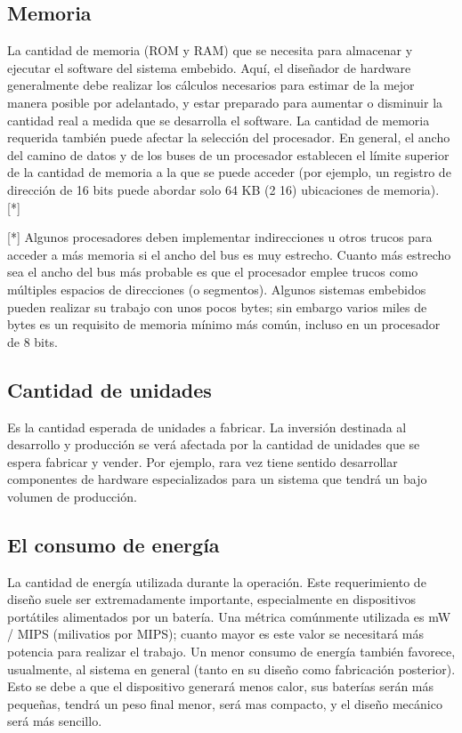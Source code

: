 \documentclass[output=paper, 
colorlinks,
citecolor=brown,
newtxmath
]{langscibook}
\begin{document}
\subsection {Memoria}

La cantidad de memoria (ROM y RAM) que se necesita para almacenar
y ejecutar el software del sistema embebido. Aquí, el diseñador de 
hardware generalmente debe realizar los cálculos necesarios para
estimar de la mejor manera posible por adelantado, y estar preparado para 
aumentar o disminuir la cantidad real a medida que se desarrolla el software. 
La cantidad de memoria requerida también puede afectar la selección del 
procesador. En general, el ancho del camino de datos y de los buses de un procesador 
establecen el límite superior de la cantidad de memoria a la que se puede 
acceder (por ejemplo, un registro de dirección de 16 bits puede abordar solo 
64 KB (2 16) ubicaciones de memoria). [*]


[*]
Algunos procesadores deben implementar indirecciones u otros trucos
para acceder a más memoria si el ancho del bus es muy estrecho.
Cuanto más estrecho sea el ancho del bus más probable es que el procesador 
emplee trucos como múltiples espacios de direcciones (o segmentos).
Algunos sistemas embebidos pueden realizar su trabajo
con unos pocos bytes; sin embargo varios miles de bytes es un requisito de
memoria mínimo más común, incluso en un procesador de 8 bits.


\subsection {Cantidad de unidades}

Es la cantidad esperada de unidades a fabricar. 
La inversión destinada al desarrollo y producción se verá afectada 
por la cantidad de unidades que se espera fabricar y vender.
Por ejemplo, rara vez tiene sentido desarrollar componentes de 
hardware especializados para un sistema que tendrá un bajo volumen de producción.



\subsection {El consumo de energía}

La cantidad de energía utilizada durante la operación. 
Este requerimiento de diseño suele ser extremadamente importante, 
especialmente en dispositivos portátiles alimentados por un batería. 
Una métrica comúnmente utilizada es mW / MIPS (milivatios por MIPS); 
cuanto mayor es este valor se necesitará más potencia para realizar el trabajo. 
Un menor consumo de energía también favorece, usualmente,
al sistema en general (tanto en su diseño como fabricación posterior). Esto
se debe a que el dispositivo generará menos calor, sus
baterías serán más pequeñas, tendrá un peso final menor, 
será mas compacto, y el diseño mecánico será más sencillo.
\end{document}
